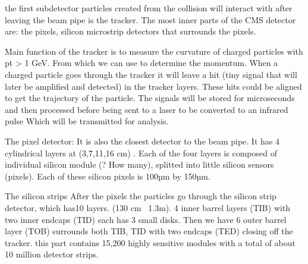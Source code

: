 



the first subdetector particles created from the collision will interact with after leaving the beam pipe is the tracker. The most inner parts of the CMS detector are: the pixels, silicon microstrip detectors that surrounds the pixels.  
 
Main function of the tracker is to measure the curvature of charged particles with pt > 1 GeV. From which we can use to determine the momentum. When a charged particle goes through the tracker it will leave a hit (tiny signal that will later be amplified and detected) in the tracker layers. These hits could be aligned to get the trajectory of the particle. The signals will be stored for microseconds and then processed before being sent to a laser to be converted to an infrared pulse Which will be transmitted for analysis.  

The pixel detector: 
It is also the closest detector to the beam pipe. It has 4 cylindrical layers at (3,7,11,16 cm) . Each of the four layers is composed of individual silicon module (? How many), splitted into little silicon sensors (pixels).  Each of these silicon pixels is 100µm by 150µm.  

The silicon strips 
After the pixels the particles go through the silicon strip detector, which has10 layers. (130 cm~ 1.3m). 4 inner barrel layers (TIB) with two inner endcaps (TID) each has 3 small disks. Then we have 6 outer barrel layer (TOB) surrounds both TIB, TID with two endcaps (TED) closing off the tracker. this part contains 15,200 highly sensitive modules with a total of about 10 million detector strips.  


